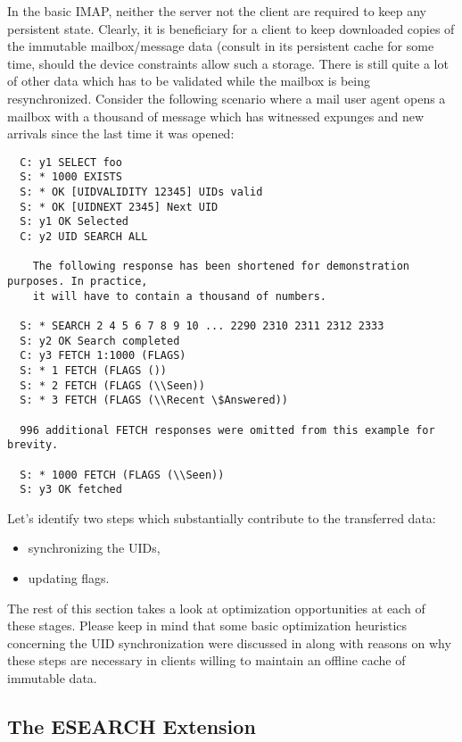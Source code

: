 \documentclass[trojita]{subfiles}
\begin{document}
In the basic IMAP, neither the server not the client are required to keep any persistent state.  Clearly, it is
beneficiary for a client to keep downloaded copies of the immutable mailbox/message data (consult
 in its persistent cache for some time, should the device constraints allow such a
storage.  There is still quite a lot of other data which has to be validated while the mailbox is being resynchronized.
Consider the following scenario where a mail user agent opens a mailbox with a thousand of message which has witnessed
expunges and new arrivals since the last time it was opened:

\begin{verbatim}
  C: y1 SELECT foo
  S: * 1000 EXISTS
  S: * OK [UIDVALIDITY 12345] UIDs valid
  S: * OK [UIDNEXT 2345] Next UID
  S: y1 OK Selected
  C: y2 UID SEARCH ALL

    The following response has been shortened for demonstration purposes. In practice,
    it will have to contain a thousand of numbers.

  S: * SEARCH 2 4 5 6 7 8 9 10 ... 2290 2310 2311 2312 2333
  S: y2 OK Search completed
  C: y3 FETCH 1:1000 (FLAGS)
  S: * 1 FETCH (FLAGS ())
  S: * 2 FETCH (FLAGS (\\Seen))
  S: * 3 FETCH (FLAGS (\\Recent \$Answered))

  996 additional FETCH responses were omitted from this example for brevity.

  S: * 1000 FETCH (FLAGS (\\Seen))
  S: y3 OK fetched
\end{verbatim}

Let's identify two steps which substantially contribute to the transferred data:

\begin{itemize}
  \item synchronizing the UIDs,
  \item updating flags.
\end{itemize}

The rest of this section takes a look at optimization opportunities at each of these stages.  Please keep in mind that
some basic optimization heuristics concerning the UID synchronization were discussed in 
along with reasons on why these steps are necessary in clients willing to maintain an offline cache of immutable data.

\subsection{The ESEARCH Extension}
\end{document}
